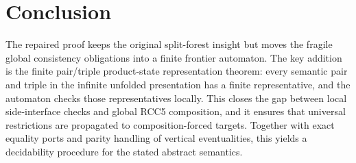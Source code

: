 \documentclass[11pt]{article}
\begin{document}
\section{Conclusion}

The repaired proof keeps the original split-forest insight but moves the fragile global consistency obligations into a finite frontier automaton.  The key addition is the finite pair/triple product-state representation theorem: every semantic pair and triple in the infinite unfolded presentation has a finite representative, and the automaton checks those representatives locally.  This closes the gap between local side-interface checks and global RCC5 composition, and it ensures that universal restrictions are propagated to composition-forced targets.  Together with exact equality ports and parity handling of vertical eventualities, this yields a decidability procedure for the stated abstract semantics.
\end{document}
